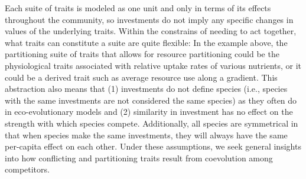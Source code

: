 Each suite of traits is modeled as one unit and only in terms of its 
effects throughout the community, so
investments do not imply any specific changes in values of the
underlying traits.
Within the constrains of needing to act together, what traits can
constitute a suite are quite flexible:
In the example above, the partitioning suite of traits that allows for 
resource partitioning could be the physiological traits associated with 
relative uptake rates of various nutrients, or it could be a derived trait 
such as average resource use along a gradient.
This abstraction also means that (1) investments do not define species
(i.e., species with the same investments are not considered the same species)
as they often do in eco-evolutionary models \citep[e.g., ][]{Northfield2021}
and
(2) similarity in investment has no effect on the strength with which 
species compete.
Additionally, all species are symmetrical in that when species make the
same investments, they will always have the same per-capita effect on
each other.
Under these assumptions, we seek general insights into how conflicting 
and partitioning traits result from coevolution among competitors.














